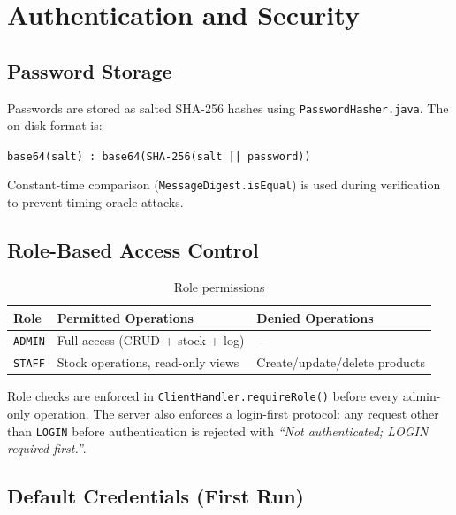 \documentclass[12pt,a4paper]{article}
\begin{document}
\section{Authentication and Security}

\subsection{Password Storage}

Passwords are stored as salted SHA-256 hashes using \texttt{PasswordHasher.java}.
The on-disk format is:

\begin{center}
  \texttt{base64(salt) : base64(SHA-256(salt || password))}
\end{center}

Constant-time comparison (\texttt{MessageDigest.isEqual}) is used during
verification to prevent timing-oracle attacks.

\subsection{Role-Based Access Control}

\begin{table}[H]
\centering
\begin{tabular}{lll}
\toprule
\textbf{Role} & \textbf{Permitted Operations} & \textbf{Denied Operations} \\
\midrule
\texttt{ADMIN} & Full access (CRUD + stock + log) & --- \\
\texttt{STAFF} & Stock operations, read-only views & Create/update/delete products \\
\bottomrule
\end{tabular}
\caption{Role permissions}
\end{table}

Role checks are enforced in \texttt{ClientHandler.requireRole()} before every
admin-only operation. The server also enforces a login-first protocol: any request
other than \texttt{LOGIN} before authentication is rejected with
\textit{``Not authenticated; LOGIN required first.''}.

\subsection{Default Credentials (First Run)}
\end{document}

